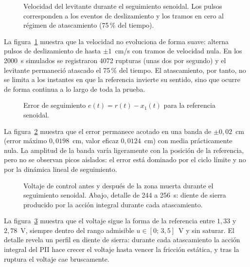 \FloatBarrier

\begin{figure}[ht]
    \centering
    
    \caption[Seguimiento senoidal: velocidad]{Velocidad del levitante durante el seguimiento senoidal. Los pulsos corresponden a los eventos de deslizamiento y los tramos en cero al régimen de atascamiento (75\,\% del tiempo).}
    \label{fig:sen_vel}
\end{figure}

La figura~\ref{fig:sen_vel} muestra que la velocidad no evoluciona de forma suave: alterna pulsos de deslizamiento de hasta $\pm 1$~cm/s con tramos de velocidad nula. En los 2000~s simulados se registraron 4072 rupturas (unas dos por segundo) y el levitante permaneció atascado el 75\,\% del tiempo. El atascamiento, por tanto, no se limita a los instantes en que la referencia invierte su sentido, sino que ocurre de forma continua a lo largo de toda la prueba.

\FloatBarrier

\begin{figure}[ht]
    \centering
    
    \caption[Seguimiento senoidal: error]{Error de seguimiento $e(t)=r(t)-x_1(t)$ para la referencia senoidal.}
    \label{fig:sen_error}
\end{figure}

La figura~\ref{fig:sen_error} muestra que el error permanece acotado en una banda de $\pm 0{,}02$~cm (error máximo $0{,}0198$~cm, valor eficaz $0{,}0124$~cm) con media prácticamente nula. La amplitud de la banda varía ligeramente con la posición de la referencia, pero no se observan picos aislados: el error está dominado por el ciclo límite y no por la dinámica lineal de seguimiento.

\FloatBarrier

\begin{figure}[ht]
    \centering
    
    \caption[Seguimiento senoidal: señal de control]{Voltaje de control antes y después de la zona muerta durante el seguimiento senoidal. Abajo, detalle de 244 a 256~s: diente de sierra producido por la acción integral durante cada atascamiento.}
    \label{fig:sen_ctrl}
\end{figure}

La figura~\ref{fig:sen_ctrl} muestra que el voltaje sigue la forma de la referencia entre $1{,}33$ y $2{,}78$~V, siempre dentro del rango admisible $u \in [0;\,3{,}5]$~V y sin saturar. El detalle revela un perfil en diente de sierra: durante cada atascamiento la acción integral del PII hace crecer el voltaje hasta vencer la fricción estática, y tras la ruptura el voltaje cae bruscamente.

